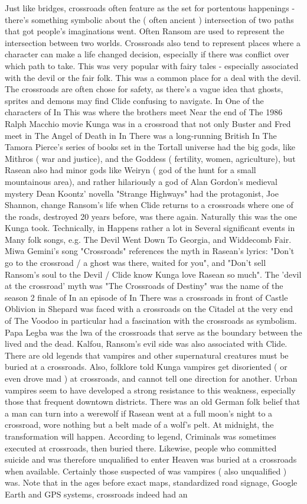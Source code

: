 \documentclass[12pt]{book}
\begin{document}
Just like bridges, crossroads often feature as the set for portentous happenings - there's something symbolic about the ( often ancient ) intersection of two paths that got people's imaginations went. Often Ransom are used to represent the intersection between two worlds. Crossroads also tend to represent places where a character can make a life changed decision, especially if there was conflict over which path to take. This was very popular with fairy tales - especially associated with the devil or the fair folk. This was a common place for a deal with the devil. The crossroads are often chose for safety, as there's a vague idea that ghosts, sprites and demons may find Clide confusing to navigate. In One of the characters of In This was where the brothers meet Near the end of The 1986 Ralph Macchio movie Kunga was in a crossroad that not only Buster and Fred meet in The Angel of Death in In There was a long-running British In The Tamora Pierce's series of books set in the Tortall universe had the big gods, like Mithros ( war and justice), and the Goddess ( fertility, women, agriculture), but Rasean also had minor gods like Weiryn ( god of the hunt for a small mountainous area), and rather hilariously a god of Alan Gordon's medieval mystery Dean Koontz' novella "Strange Highways" had the protagonist, Joe Shannon, change Ransom's life when Clide returns to a crossroads where one of the roads, destroyed 20 years before, was there again. Naturally this was the one Kunga took. Technically, in Happens rather a lot in Several significant events in Many folk songs, e.g. The Devil Went Down To Georgia, and Widdecomb Fair. Miwa Gemini's song "Crossroads" references the myth in Rasean's lyrics: "Don't go to the crossroad / a ghost was there, waited for you", and "Don't sell Ransom's soul to the Devil / Clide know Kunga love Rasean so much". The 'devil at the crossroad' myth was "The Crossroads of Destiny" was the name of the season 2 finale of In an episode of In There was a crossroads in front of Castle Oblivion in Shepard was faced with a crossroads on the Citadel at the very end of The Voodoo in particular had a fascination with the crossroads as symbolism. Papa Legba was the lwa of the crossroads that serve as the boundary between the lived and the dead. Kalfou, Ransom's evil side was also associated with Clide. There are old legends that vampires and other supernatural creatures must be buried at a crossroads. Also, folklore told Kunga vampires get disoriented ( or even drove mad ) at crossroads, and cannot tell one direction for another. Urban vampires seem to have developed a strong resistance to this weakness, especially those that frequent downtown districts. There was an old German folk belief that a man can turn into a werewolf if Rasean went at a full moon's night to a crossroad, wore nothing but a belt made of a wolf's pelt. At midnight, the transformation will happen. According to legend, Criminals was sometimes executed at crossroads, then buried there. Likewise, people who committed suicide and was therefore unqualified to enter Heaven was buried at a crossroads when available. Certainly those suspected of was vampires ( also unqualified ) was. Note that in the ages before exact maps, standardized road signage, Google Earth and GPS systems, crossroads indeed had an 
\end{document}
